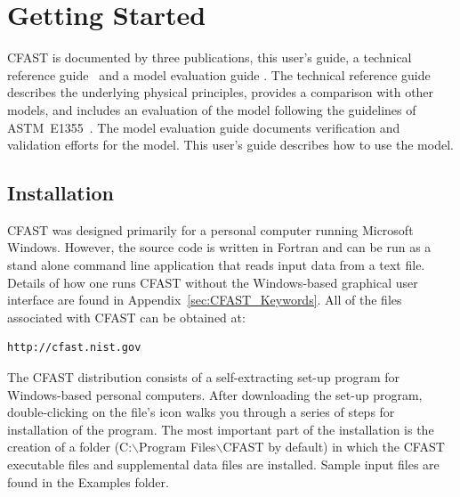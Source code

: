 
\chapter{Getting Started}

CFAST is documented by three publications, this user's guide, a technical reference guide~\cite{CFAST_Tech_Guide_7} and a model evaluation guide \cite{CFAST_Valid_Guide_7}. The technical reference guide describes the underlying physical principles, provides a comparison with other models, and includes an evaluation of the model following the guidelines of ASTM~E1355~\cite{ASTM:E1355}. The model evaluation guide documents verification and validation efforts for the model. This user's guide describes how to use the model.

\section{Installation}

CFAST was designed primarily for a personal computer running Microsoft Windows. However, the source code is written in Fortran and can be run as a stand alone command line application that reads input data from a text file. Details of how one runs CFAST without the Windows-based graphical user interface are found in Appendix~\ref{sec:CFAST_Keywords}. All of the files associated with CFAST can be obtained at:
\begin{lstlisting}
http://cfast.nist.gov
\end{lstlisting}
The CFAST distribution consists of a self-extracting set-up program for Windows-based personal computers. After downloading the set-up program, double-clicking on the file's icon walks you through a series of steps for installation of the program.  The most important part of the installation is the creation of a folder ({\ct C:$\backslash$Program Files$\backslash$CFAST} by default) in which the CFAST executable files and supplemental data files are installed.  Sample input files are found in the {\ct Examples} folder.

